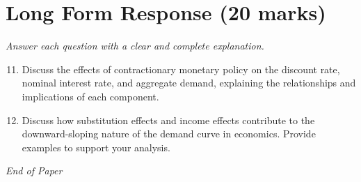 \documentclass[12pt]{article}
\begin{document}
\section*{Long Form Response (20 marks)}
\textit{Answer each question with a clear and complete explanation.}
\begin{enumerate}[label=\arabic*.]
\setcounter{enumi}{10}
\item Discuss the effects of contractionary monetary policy on the discount rate, nominal interest rate, and aggregate demand, explaining the relationships and implications of each component.
\item Discuss how substitution effects and income effects contribute to the downward-sloping nature of the demand curve in economics. Provide examples to support your analysis.
\end{enumerate}

\vfill
\noindent\textit{End of Paper}
\end{document}
